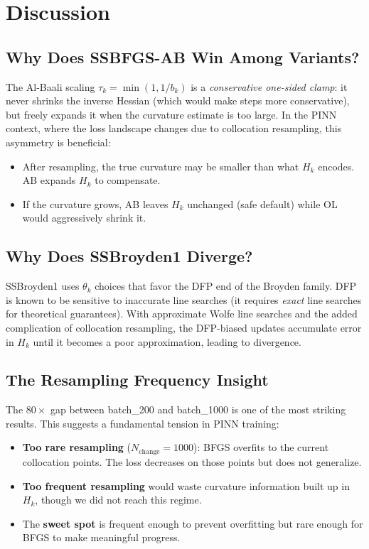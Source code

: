 \documentclass[11pt,a4paper]{article}
\newcommand{\Hk}{H_k}
\newcommand{\tp}{\tau_k}
\newcommand{\thk}{\theta_k}
\begin{document}
\section{Discussion}
\label{sec:discussion}

\subsection{Why Does SSBFGS-AB Win Among Variants?}

The Al-Baali scaling $\tp = \min(1, 1/b_k)$ is a \emph{conservative
one-sided clamp}: it never shrinks the inverse Hessian (which would make
steps more conservative), but freely expands it when the curvature
estimate is too large.  In the PINN context, where the loss landscape
changes due to collocation resampling, this asymmetry is beneficial:
\begin{itemize}[nosep]
  \item After resampling, the true curvature may be smaller than what
        $\Hk$ encodes.  AB expands $\Hk$ to compensate.
  \item If the curvature grows, AB leaves $\Hk$ unchanged (safe default)
        while OL would aggressively shrink it.
\end{itemize}

\subsection{Why Does SSBroyden1 Diverge?}

SSBroyden1 uses $\thk$ choices that favor the DFP end of the Broyden
family.  DFP is known to be sensitive to inaccurate line searches
(it requires \emph{exact} line searches for theoretical guarantees).
With approximate Wolfe line searches and the added complication of
collocation resampling, the DFP-biased updates accumulate error in
$\Hk$ until it becomes a poor approximation, leading to divergence.

\subsection{The Resampling Frequency Insight}

The $80\times$ gap between batch\_200 and batch\_1000 is one of the
most striking results.  This suggests a fundamental tension in PINN
training:
\begin{itemize}[nosep]
  \item \textbf{Too rare resampling} ($N_{\text{change}} = 1000$):
        BFGS overfits to the current collocation points.  The loss
        decreases on those points but does not generalize.
  \item \textbf{Too frequent resampling} would waste curvature information
        built up in $\Hk$, though we did not reach this regime.
  \item The \textbf{sweet spot} is frequent enough to prevent overfitting
        but rare enough for BFGS to make meaningful progress.
\end{itemize}
\end{document}
